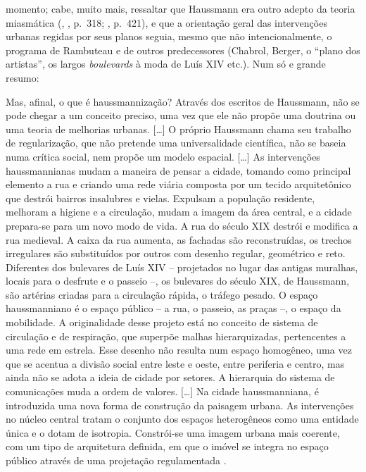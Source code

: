 momento; cabe, muito mais, ressaltar que Haussmann era outro adepto da teoria miasmática (\citeauthor{haussmann1890memoires-2}, \citeyear{haussmann1890memoires-2}, p.~318; \citeyear{haussmann1890memoires-3}, p.~421), e que a orientação geral das intervenções urbanas regidas por seus planos seguia, mesmo que não intencionalmente, o programa de Rambuteau e de outros predecessores (Chabrol, Berger, o ``plano dos artistas'', os largos \textit{boulevards} à moda de Luís XIV etc.). Num só e grande resumo:

\begin{citacao}
Mas, afinal, o que é haussmannização? Através dos escritos de Haussmann, não se pode chegar a um conceito preciso, uma vez que ele não propõe uma doutrina ou uma teoria de melhorias urbanas.
[\dots] O próprio Haussmann chama seu trabalho de regularização, que não pretende uma universalidade científica, não se baseia numa crítica social, nem propõe um modelo espacial.
[\dots] As intervenções haussmannianas mudam a maneira de pensar a cidade, tomando como principal elemento a rua e criando uma rede viária composta por um tecido arquitetônico que destrói bairros insalubres e vielas. Expulsam a população residente, melhoram a higiene e a circulação, mudam a imagem da área central, e a cidade prepara-se para um novo modo de vida. A rua do século XIX destrói e modifica a rua medieval. A caixa da rua aumenta, as fachadas são reconstruídas, os trechos irregulares são substituídos por outros com desenho regular, geométrico e reto. Diferentes dos bulevares de Luís XIV -- projetados no lugar das antigas muralhas, locais para o desfrute e o passeio --, os bulevares do século XIX, de Haussmann, são artérias criadas para a circulação rápida, o tráfego pesado. O espaço haussmanniano é o espaço público -- a rua, o passeio, as praças --, o espaço da mobilidade. A originalidade desse projeto está no conceito de sistema de circulação e de respiração, que superpõe malhas hierarquizadas, pertencentes a uma rede em estrela. Esse desenho não resulta num espaço homogêneo, uma vez que se acentua a divisão social entre leste e oeste, entre periferia e centro, mas ainda não se adota a ideia de cidade por setores. A hierarquia do sistema de comunicações muda a ordem de valores.
[\dots] Na cidade haussmanniana, é introduzida uma nova forma de construção da paisagem urbana. As intervenções no núcleo central tratam o conjunto dos espaços heterogêneos como uma entidade única e o dotam de isotropia. Constrói-se uma imagem urbana mais coerente, com um tipo de arquitetura definida, em que o imóvel se integra no espaço público através de uma projetação regulamentada \cite[pp.~68,~77]{petti_eurfranba_2011}.
\end{citacao}

